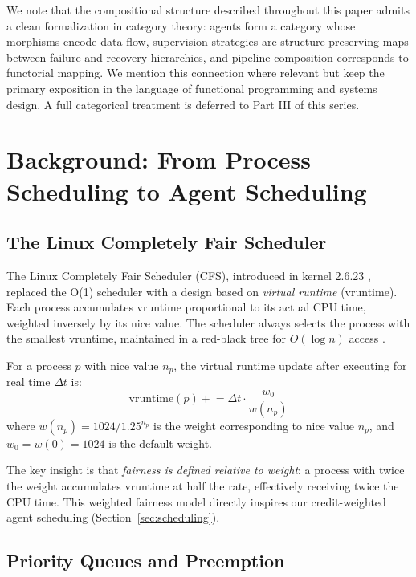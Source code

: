 \documentclass[12pt,a4paper]{article}
\theoremstyle{definition}
\theoremstyle{remark}
\begin{document}
We note that the compositional structure described throughout this paper admits a clean formalization in category theory: agents form a category whose morphisms encode data flow, supervision strategies are structure-preserving maps between failure and recovery hierarchies, and pipeline composition corresponds to functorial mapping. We mention this connection where relevant but keep the primary exposition in the language of functional programming and systems design. A full categorical treatment is deferred to Part III of this series.

\section{Background: From Process Scheduling to Agent Scheduling}\label{sec:background}

\subsection{The Linux Completely Fair Scheduler}

The Linux Completely Fair Scheduler (CFS), introduced in kernel 2.6.23 \citep{pabla2009completely}, replaced the O(1) scheduler with a design based on \emph{virtual runtime} (vruntime). Each process accumulates vruntime proportional to its actual CPU time, weighted inversely by its nice value. The scheduler always selects the process with the smallest vruntime, maintained in a red-black tree for $O(\log n)$ access \citep{love2010linux}.

For a process $p$ with nice value $n_p$, the virtual runtime update after executing for real time $\Delta t$ is:
\begin{equation}\label{eq:vruntime}
  \text{vruntime}(p) \mathrel{+}= \Delta t \cdot \frac{w_0}{w(n_p)}
\end{equation}
where $w(n_p) = 1024 / 1.25^{n_p}$ is the weight corresponding to nice value $n_p$, and $w_0 = w(0) = 1024$ is the default weight.

The key insight is that \emph{fairness is defined relative to weight}: a process with twice the weight accumulates vruntime at half the rate, effectively receiving twice the CPU time. This weighted fairness model directly inspires our credit-weighted agent scheduling (Section~\ref{sec:scheduling}).

\subsection{Priority Queues and Preemption}
\end{document}
